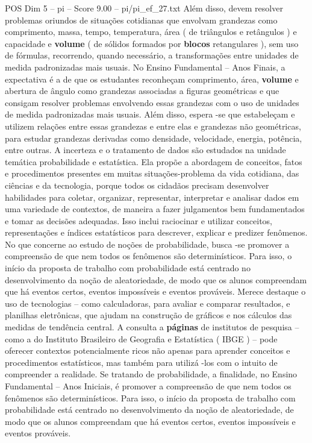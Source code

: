 \begin{textsample}{POS Dim 5 – pi – Score 9.00 – pi/pi\_ef\_27.txt}
Além disso, devem resolver problemas oriundos de situações cotidianas que envolvam grandezas como comprimento, massa, tempo, temperatura, área ( de triângulos e retângulos ) e capacidade e \textbf{volume} ( de sólidos formados por \textbf{blocos} retangulares ), sem uso de fórmulas, recorrendo, quando necessário, a transformações entre unidades de medida padronizadas mais usuais.
No Ensino Fundamental – Anos Finais, a expectativa é a de que os estudantes reconheçam comprimento, área, \textbf{volume} e abertura de ângulo como grandezas associadas a figuras geométricas e que consigam resolver problemas envolvendo essas grandezas com o uso de unidades de medida padronizadas mais usuais.
Além disso, espera -se que estabeleçam e utilizem relações entre essas grandezas e entre elas e grandezas não geométricas, para estudar grandezas derivadas como densidade, velocidade, energia, potência, entre outras.
A incerteza e o tratamento de dados são estudados na unidade temática probabilidade e estatística.
Ela propõe a abordagem de conceitos, fatos e procedimentos presentes em muitas situações-problema da vida cotidiana, das ciências e da tecnologia, porque todos os cidadãos precisam desenvolver habilidades para coletar, organizar, representar, interpretar e analisar dados em uma variedade de contextos, de maneira a fazer julgamentos bem fundamentados e tomar as decisões adequadas.
Isso inclui raciocinar e utilizar conceitos, representações e índices estatísticos para descrever, explicar e predizer fenômenos.
No que concerne ao estudo de noções de probabilidade, busca -se promover a compreensão de que nem todos os fenômenos são determinísticos.
Para isso, o início da proposta de trabalho com probabilidade está centrado no desenvolvimento da noção de aleatoriedade, de modo que os alunos compreendam que há eventos certos, eventos impossíveis e eventos prováveis.
Merece destaque o uso de tecnologias – como calculadoras, para avaliar e comparar resultados, e planilhas eletrônicas, que ajudam na construção de gráficos e nos cálculos das medidas de tendência central.
A consulta a \textbf{páginas} de institutos de pesquisa – como a do Instituto Brasileiro de Geografia e Estatística ( IBGE ) – pode oferecer contextos potencialmente ricos não apenas para aprender conceitos e procedimentos estatísticos, mas também para utilizá -los com o intuito de compreender a realidade.
Se tratando de probabilidade, a finalidade, no Ensino Fundamental – Anos Iniciais, é promover a compreensão de que nem todos os fenômenos são determinísticos.
Para isso, o início da proposta de trabalho com probabilidade está centrado no desenvolvimento da noção de aleatoriedade, de modo que os alunos compreendam que há eventos certos, eventos impossíveis e eventos prováveis.

\end{textsample}
